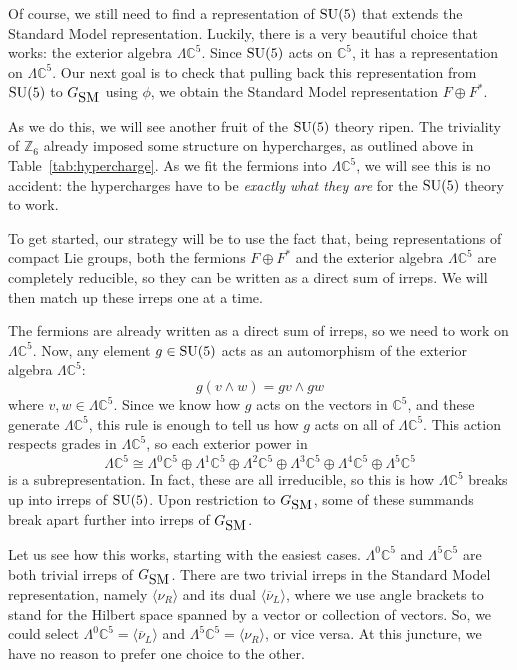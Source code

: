 \documentclass{article}
\newcommand{\C}{{\mathbb C}}  %
\newcommand{\Z}{{\mathbb Z}}  %
\newcommand{\SU}{{\rm SU}}    %
\newcommand{\Ex}{\Lambda} %
\newcommand{\iso}{\cong} %
\newcommand{\GSM}{{G_{\mbox{\rm SM}}}}  %
\newcommand{\nubar}{\overline{\nu}} %
\begin{document}
Of course, we still need to find a representation of $\SU(5)$ that extends the 
Standard Model representation.   Luckily, there is a very beautiful choice
that works: the exterior algebra $\Ex \C^5$.
Since $\SU(5)$ acts on $\C^5$, it has a representation on $\Ex \C^5$.
Our next goal is to check that pulling back this representation from
$\SU(5)$ to $\GSM$ using $\phi$, we obtain the Standard Model
representation $F \oplus F^*.$

As we do this, we will see another fruit of the $\SU(5)$ theory ripen. The
triviality of $\Z_6$ already imposed some structure on hypercharges,
as outlined above in Table~\ref{tab:hypercharge}. As we fit the
fermions into $\Ex \C^5$, we will see this is no accident: the
hypercharges have to be \emph{exactly what they are} for the
$\SU(5)$ theory to work.

To get started, our strategy will be to use the fact that, being
representations of compact Lie groups, both the fermions $F \oplus
F^*$ and the exterior algebra $\Ex \C^5$ are completely reducible, 
so they can be written as a direct sum of irreps. We will then match up
these irreps one at a time.

The fermions are already written as a direct sum of irreps, so we need
to work on $\Ex \C^5$. Now, any element $g \in \SU(5)$ acts as an automorphism
of the exterior algebra $\Ex \C^5$:
\[ g(v \wedge w) = gv \wedge gw \]
where $v,w \in \Ex \C^5$. Since we know how $g$ acts on the vectors in $\C^5$,
and these generate $\Ex \C^5$, this rule is enough to tell us how $g$ acts on
all of $\Ex \C^5$. This action respects grades in $\Ex \C^5$, so each
exterior power in
\[ \Ex \C^5 \iso \Ex^0 \C^5 \oplus \Ex^1 \C^5 \oplus \Ex^2 \C^5 \oplus \Ex^3 \C^5 \oplus \Ex^4 \C^5 \oplus \Ex^5 \C^5    \]
is a subrepresentation. In fact, these are all irreducible, so this is
how $\Ex \C^5$ breaks up into irreps of $\SU(5)$.  Upon restriction to $\GSM$,
some of these summands break apart further into irreps of $\GSM$.

Let us see how this works, starting with the easiest cases.  $\Ex^0
\C^5$ and $\Ex^5 \C^5$ are both trivial irreps of $\GSM$.   There
are two trivial irreps in the Standard Model representation, namely 
$\langle \nu_R \rangle$ and its dual $\langle \nubar_L \rangle$,
where we use angle brackets to stand for the Hilbert space spanned by 
a vector or collection of vectors.
So, we could select $\Ex^0 \C^5 = \langle \nubar_L \rangle$ and $\Ex^5
\C^5 = \langle \nu_R \rangle$, or vice versa. At this juncture, we
have no reason to prefer one choice to the other.
\end{document}
